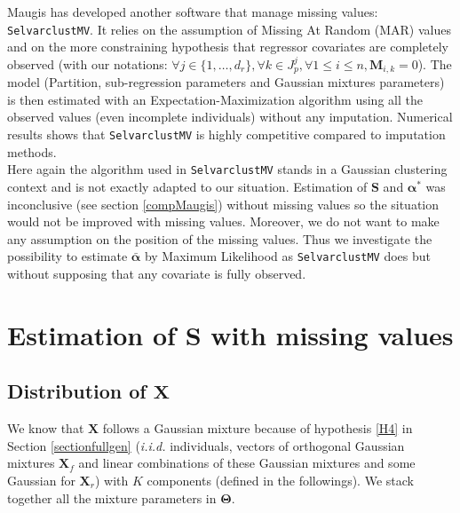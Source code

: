 \documentclass[12pt,a4paper]{report}
\begin{document}
	Maugis  has developed another software \cite{maugis2012selvarclustmv} that manage missing values: {\tt SelvarclustMV}. It relies on the assumption of Missing At Random (MAR) values and on the more constraining hypothesis that regressor covariates are completely observed (with our notations: $\forall j \in \{1,\dots,d_r \}, \forall k \in J_p^j, \forall 1\leq i \leq n, \boldsymbol{M}_{i,k}=0$). The model (Partition, sub-regression parameters and Gaussian mixtures parameters) is then estimated with an Expectation-Maximization algorithm using all the observed values (even incomplete individuals) without any imputation. Numerical results shows that {\tt SelvarclustMV} is highly competitive compared to imputation methods.\\
 Here again the algorithm used in {\tt SelvarclustMV} stands in a Gaussian clustering context and is not exactly adapted to our situation. Estimation of $\boldsymbol{S}$ and $\boldsymbol{\alpha}^*$ was inconclusive (see section \ref{compMaugis}) without missing values so the situation would not be improved with missing values.
 Moreover, we do not want to make any assumption on the position of the missing values. Thus we investigate the possibility to estimate $\bar{\boldsymbol{\alpha}}$ by Maximum Likelihood as {\tt SelvarclustMV} does but without supposing that any covariate is fully observed.\\

\section{Estimation of $\boldsymbol{S}$ with missing values}
\subsection{Distribution of $\boldsymbol{X}$} \label{sectionXdensity}
	We know that $\boldsymbol{X}$ follows a Gaussian mixture because of hypothesis \ref{H4} in Section \ref{sectionfullgen} ({\it i.i.d.} individuals, vectors of orthogonal Gaussian mixtures $\boldsymbol{X}_f$ and linear combinations of these Gaussian mixtures and some Gaussian for $\boldsymbol{X}_r$) with $K$ components (defined in the followings). We stack together all the mixture parameters in  $\boldsymbol{\Theta}$.%
	
\end{document}
